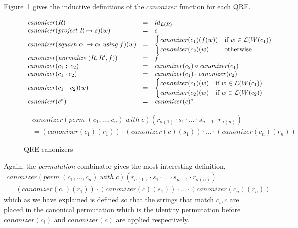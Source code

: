 \documentclass[acmsmall,review,anonymous]{acmart}
\newcommand{\kw}[1]{\ensuremath{\mathit{#1}}}
\newcommand{\project}[2]{\ensuremath{\kw{project} \; #1 \mapsto #2}}
\newcommand{\squash}[3]{\ensuremath{\kw{squash} \; #1 \rightarrow #2\; \kw{using} \; #3}}
\newcommand{\perm}[2]{\ensuremath{\kw{perm}\; (#1)\; \kw{with}\; #2}}
\newcommand{\normalize}[3]{\ensuremath{\kw{normalize} \; (#1, #2, #3)}}
\newcommand{\sep}{\ensuremath{\ | \ }}
\newcommand{\canonizer}{\ensuremath{\kw{canonizer}}}
\begin{document}
Figure~\ref{fig:canonizers} gives the inductive definitions of the
$\canonizer{}$ function for each QRE.
\begin{figure}[t]
\begin{center}
\[
\begin{array}{l@\quad l @\quad l}
\canonizer(R) &=& id_{\mathcal{L}(R)} \\
\canonizer(\project{R}{s})(w) &=& s\\
\canonizer(\squash{c_1}{c_2}{f})(w) &=&
\begin{cases}
\canonizer(c_1)(f(w)) & \text{if } w \in \mathcal{L}(W(c_1))\\
\canonizer(c_2)(w) & \text{otherwise}
\end{cases}\\
\canonizer(\normalize{R}{R'}{f}) &=& f\\
\canonizer(c_1 \; ; \; c_2) &=& \canonizer(c_2) \circ \canonizer(c_1)\\
\canonizer(c_1 \cdot c_2) &=& \canonizer(c_1) \cdot \canonizer(c_2)\\
\canonizer(c_1 \sep c_2)(w) &=&
\begin{cases}
\canonizer(c_1)(w) & \text{if } w \in \mathcal{L}(W(c_1))\\
\canonizer(c_2)(w) & \text{if } w \in \mathcal{L}(W(c_2))\\
\end{cases}\\
\canonizer(c^*) &=& \canonizer(c)^* \\
\end{array}
\]
\end{center}
\begin{align*}
&\canonizer(\perm{c_1, \ldots, c_n}{c})(r_{\sigma(1)}
\cdot s_1 \cdot \ldots \cdot s_{n-1} \cdot r_{\sigma(n)})\\
&= (\canonizer(c_1)(r_1)) \cdot (\canonizer(c)(s_1)) \cdot \ldots \cdot
(\canonizer(c_n)(r_n))
\end{align*}
\caption{QRE canonizers}
\label{fig:canonizers}
\end{figure}
Again, the \textit{permutation} combinator gives the most interesting
definition,
\begin{align*}\canonizer(\perm{c_1, \ldots, c_n}{c})(r_{\sigma(1)}
\cdot s_1 \cdot \ldots \cdot s_{n-1} \cdot r_{\sigma(n)}) \\
= (\canonizer(c_1)(r_1)) \cdot (\canonizer(c)(s_1)) \cdot \ldots \cdot
(\canonizer(c_n)(r_n))
\end{align*}
\noindent which as we have explained is defined so that the strings that match
$c_i, c$ are placed in the canonical permutation which is the identity
permutation before $\canonizer(c_i)$ and $\canonizer(c)$ are applied
respectively.
\end{document}
